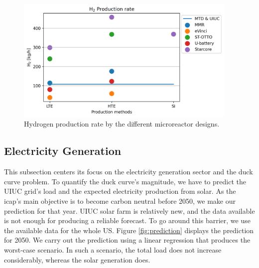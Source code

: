 	\begin{figure}[htbp!]
	    \centering
		\includegraphics[height=6.0cm]{figures-hydro/reactors-by-hour1}
		\hfill
		\caption{Hydrogen production rate by the different microreactor designs.}
		\label{fig:hydro-micro}
	\end{figure}

\subsection{Electricity Generation}

This subsection centers its focus on the electricity generation sector and the duck curve problem.
To quantify the duck curve's magnitude, we have to predict the \gls{UIUC} grid's load and the expected electricity production from solar. 
As the \gls{icap}'s main objective is to become carbon neutral before 2050, we make our prediction for that year.
\gls{UIUC} solar farm is relatively new, and the data available is not enough for producing a reliable forecast.
To go around this barrier, we use the available data for the whole \gls{US}.
Figure \ref{fig:prediction} displays the prediction for 2050.
We carry out the prediction using a linear regression that produces the worst-case scenario.
In such a scenario, the total load does not increase considerably, whereas the solar generation does.

